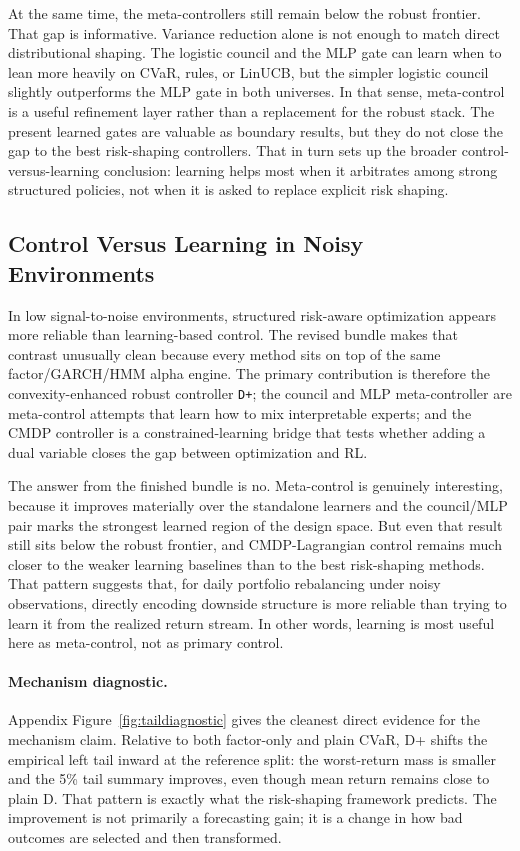 \documentclass[10pt,twocolumn]{article}
\begin{document}
At the same time, the meta-controllers still remain below the robust frontier.
That gap is informative. Variance reduction alone is not enough to match direct
distributional shaping. The logistic council and the MLP gate can learn when to
lean more heavily on CVaR, rules, or LinUCB, but the simpler logistic council
slightly outperforms the MLP gate in both universes. In that sense,
meta-control is a useful refinement layer rather than a replacement for the
robust stack. The present learned gates are valuable as boundary results, but
they do not close the gap to the best risk-shaping controllers. That in turn
sets up the broader control-versus-learning conclusion: learning helps most
when it arbitrates among strong structured policies, not when it is asked to
replace explicit risk shaping.

\subsection{Control Versus Learning in Noisy Environments}

In low signal-to-noise environments, structured risk-aware optimization appears
more reliable than learning-based control. The revised bundle makes that
contrast unusually clean because every method sits on top of the same
factor/GARCH/HMM alpha engine. The primary contribution is therefore the
convexity-enhanced robust controller \texttt{D+}; the council and MLP
meta-controller are meta-control attempts that learn how to mix interpretable
experts; and the CMDP controller is a constrained-learning bridge that tests
whether adding a dual variable closes the gap between optimization and RL.

The answer from the finished bundle is no. Meta-control is genuinely
interesting, because it improves materially over the standalone learners and
the council/MLP pair marks the strongest learned region of the design space.
But even that result still sits below the robust frontier, and
CMDP-Lagrangian control remains much closer to the weaker learning baselines
than to the best risk-shaping methods. That pattern suggests that, for daily
portfolio rebalancing under noisy observations, directly encoding downside
structure is more reliable than trying to learn it from the realized return
stream. In other words, learning is most useful here as meta-control, not as
primary control.

\paragraph{Mechanism diagnostic.}
Appendix Figure~\ref{fig:taildiagnostic} gives the cleanest direct evidence for
the mechanism claim. Relative to both factor-only and plain CVaR, D+ shifts the
empirical left tail inward at the reference split: the worst-return mass is
smaller and the 5\% tail summary improves, even though mean return remains close
to plain D. That pattern is exactly what the risk-shaping framework predicts.
The improvement is not primarily a forecasting gain; it is a change in how bad
outcomes are selected and then transformed.
\end{document}
